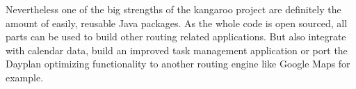 Nevertheless one of the big strengths of the kangaroo project are definitely the
amount of easily, reusable Java packages. As the whole code is open sourced, all
parts can be used to build other routing related applications. But also
integrate with calendar data, build an improved task management application or
port the Dayplan optimizing functionality to another routing engine like Google
Maps for example.
